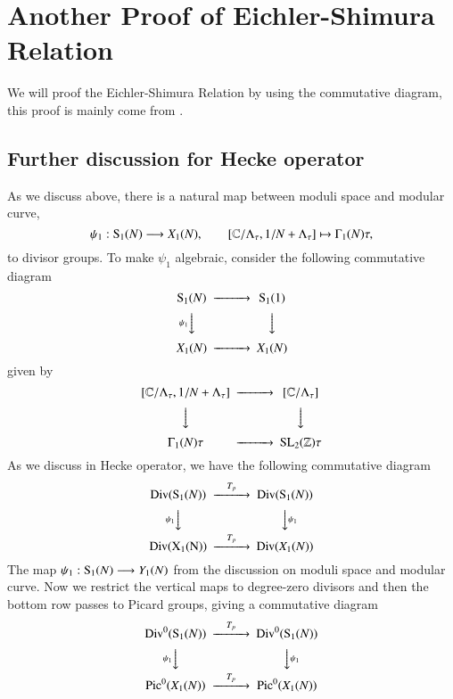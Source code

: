 \section{Another Proof of Eichler-Shimura Relation}
We will proof the Eichler-Shimura Relation by using the commutative diagram, this proof is mainly come from \cite{Fry05}.
\subsection{Further discussion for Hecke operator}
As we discuss above, there is a natural map between moduli space and modular curve,
\begin{equation*}
    \psi_1: {\rm S}_1(N) \longrightarrow X_1(N), \qquad [\mathbb{C}/\Lambda_{\tau} , 1/N +\Lambda_{\tau}]\mapsto \Gamma_1(N)\tau,
\end{equation*}
to divisor groups. To make $\psi_1$ algebraic, consider the following commutative diagram
\begin{equation*}
    \begin{CD}
        {\rm S}_1(N) @>>> {\rm S}_1(1) \\
        @V\psi_1VV @VVV\\
        X_1(N) @>>> X_1(N)
    \end{CD}
\end{equation*}
given by 
\begin{equation*}
    \begin{CD}
        [\mathbb{C}/\Lambda_{\tau} , 1/N +\Lambda_{\tau}] @>>> [\mathbb{C}/\Lambda_{\tau}]\\
        @VVV @VVV\\
        \Gamma_1(N)\tau @>>> {\rm SL}_2(\mathbb{Z})\tau 
    \end{CD}
\end{equation*}
As we discuss in Hecke operator, we have the following commutative diagram
\begin{equation*}
    \begin{CD}
        {\rm Div}({\rm S}_1 (N)) @>T_p>> {\rm Div}({\rm S}_1(N)) \\
        @V\psi_1VV @VV\psi_1V \\
        {\rm Div(X_1(N))} @>T_p>> {\rm Div}(X_1(N))
    \end{CD}
\end{equation*}
The map $\psi_1: {\rm S}_1(N) \longrightarrow Y_1(N)$ from the discussion on moduli space and modular curve. Now we restrict
the vertical maps to degree-zero divisors and then the bottom row passes to Picard groups, giving a commutative diagram
\begin{equation}
    \begin{CD}
        {\rm Div}^0({\rm S}_1 (N)) @>T_p>> {\rm Div}^0({\rm S}_1(N)) \\
        @V\psi_1VV @VV\psi_1V \\
        {\rm Pic}^0(X_1(N)) @>T_p>> {\rm Pic}^0(X_1(N))
    \end{CD}
    \label{eq:hecke_div_pic}
\end{equation}

